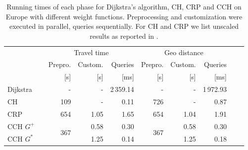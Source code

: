 \documentclass[a4paper, english, cleveref]{lipics-v2021}
\begin{document}
\begin{table}
\centering
\caption{
Running times of each phase for Dijkstra's algorithm, CH, CRP and CCH on Europe with different weight functions.
Preprocessing and customization were executed in parallel, queries sequentially.
For CH and CRP we list unscaled results as reported in \cite{DellingGPW17}.
}\label{tab:related_work}
\begin{tabular}{l@{\hskip4pt}crrrrrrrr}
\toprule
{}       &                     & \multicolumn{3}{c}{Travel time}                              & \multicolumn{3}{c}{Geo distance}   \\
                                 \cmidrule(lr){3-5}                                             \cmidrule(lr){6-8}
{}       &                     &             Prepro.  &            Custom. &          Queries &              Prepro. & Custom. &    Queries \\
{}       &                     &                 [s]  &                [s] &             [ms] &                  [s] &     [s] &       [ms] \\
\midrule
Dijkstra &                     &                    - &                  - &        2\,359.14 &                    - &       - &  1\,972.93 \\
CH       & \cite{DellingGPW17} &                  109 &                  - &             0.11 &                  726 &       - &       0.87 \\
CRP      & \cite{DellingGPW17} &                  654 &               1.05 &             1.65 &                  654 &    1.04 &       1.91 \\
\addlinespace
CCH $G^+$ &                    & \multirow{2}{*}{367} &               0.58 &             0.30 & \multirow{2}{*}{367} &    0.58 &       0.30 \\
CCH $G^*$ &                    &                      &               1.25 &             0.14 &                      &    1.25 &       0.18 \\
\bottomrule
\end{tabular}
\end{table}
\end{document}
